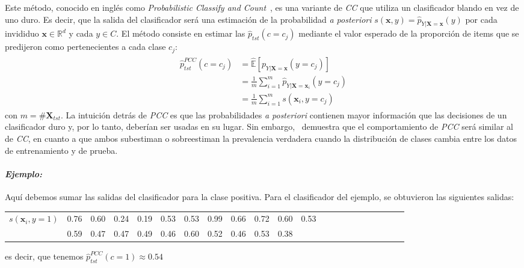 Este método, conocido en inglés como {\it Probabilistic Classify and
Count\/}~\cite{bella2010quantification, tang2010network}, es una variante de
{\it CC\/} que utiliza un clasificador blando en vez de uno duro. Es decir, que
la salida del clasificador será una estimación de la probabilidad {\it a
posteriori\/} $s(\boldsymbol{x}, y) =
\hat{p}_{Y|\boldsymbol{X}=\boldsymbol{x}}(y)$ por cada invididuo $\boldsymbol{x}
\in \mathbb{R}^d$ y cada $y \in C$. El método consiste en estimar las
$\hat{p}_{tst}(c=c_j)$ mediante el valor esperado de la proporción de items que
se predijeron como pertenecientes a cada clase $c_j$:
\begin{align}
\begin{split}
    \hat p^{PCC}_{tst}(c=c_j) &= \mathbb{\hat E}[p_{Y|\boldsymbol{X}=\boldsymbol{x}}(y=c_j)] \\
    &= \frac{1}{m} \sum \limits_{i=1}^{m}{\hat p_{Y|\boldsymbol{X}=\boldsymbol{x}_i}(y=c_j)} \\
    &= \frac{1}{m} \sum \limits_{i=1}^{m}{s(\boldsymbol{x}_i, y=c_j)}
\end{split}
\end{align}
con $m=\#\boldsymbol{X}_{tst}$. La intuición detrás de {\it PCC\/} es que las
probabilidades {\it a posteriori\/} contienen mayor información que las
decisiones de un clasificador duro y, por lo tanto, deberían ser usadas en su
lugar. Sin embargo,~\citet[Corolario 6, p. 157 y p.163]{tasche2014exact}
demuestra que el comportamiento de {\it PCC\/} será similar al de {\it CC}, en
cuanto a que ambos subestiman o sobreestiman la prevalencia verdadera cuando la
distribución de clases cambia entre los datos de entrenamiento y de prueba.

\paragraph{\it Ejemplo:\/} Aquí debemos sumar las salidas del clasificador para
la clase positiva. Para el clasificador del ejemplo, se obtuvieron las
siguientes salidas:
\begin{center}
    \begin{tabular}{lrrrrrrrrrrrrrrrrrrrrr}
        \toprule
        \textbf{$s(\boldsymbol{x}_i, y=1)$} & 0.76 & 0.60 & 0.24 & 0.19 & 0.53 &
        0.53 & 0.99 & 0.66 & 0.72 & 0.60 & 0.53 \\
        & 0.59 & 0.47 & 0.47 & 0.49 & 0.46 & 0.60 & 0.52 & 0.46 & 0.53 & 0.38 \\
        \bottomrule
    \end{tabular}
\end{center}
es decir, que tenemos $\hat p^{PCC}_{tst}(c=1) \approx 0.54$

